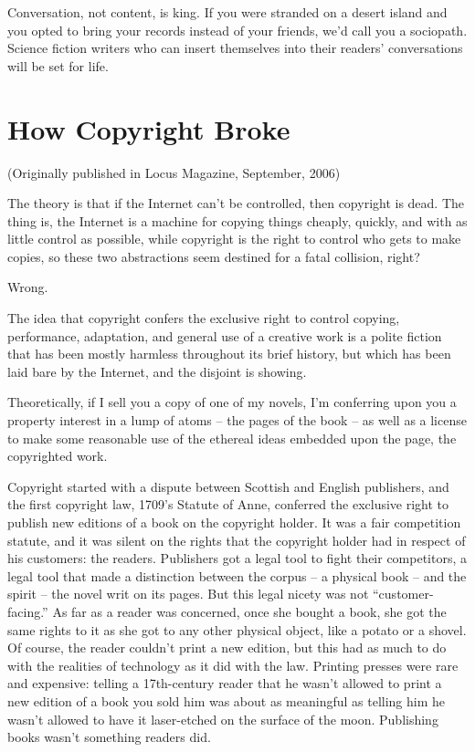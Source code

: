 Conversation, not content, is king. If you were stranded on a
desert island and you opted to bring your records instead of your
friends, we'd call you a sociopath. Science fiction writers who can
insert themselves into their readers' conversations will be set for
life.

\section{How Copyright Broke}

(Originally published in Locus Magazine, September, 2006)

The theory is that if the Internet can't be controlled, then
copyright is dead. The thing is, the Internet is a machine for
copying things cheaply, quickly, and with as little control as
possible, while copyright is the right to control who gets to make
copies, so these two abstractions seem destined for a fatal
collision, right?

Wrong.

The idea that copyright confers the exclusive right to control
copying, performance, adaptation, and general use of a creative
work is a polite fiction that has been mostly harmless throughout
its brief history, but which has been laid bare by the Internet,
and the disjoint is showing.

Theoretically, if I sell you a copy of one of my novels, I'm
conferring upon you a property interest in a lump of atoms -- the
pages of the book -- as well as a license to make some reasonable
use of the ethereal ideas embedded upon the page, the copyrighted
work.

Copyright started with a dispute between Scottish and English
publishers, and the first copyright law, 1709's Statute of Anne,
conferred the exclusive right to publish new editions of a book on
the copyright holder. It was a fair competition statute, and it was
silent on the rights that the copyright holder had in respect of
his customers: the readers. Publishers got a legal tool to fight
their competitors, a legal tool that made a distinction between the
corpus -- a physical book -- and the spirit -- the novel writ\sic{} on
its pages. But this legal nicety was not ``customer-facing.'' As far
as a reader was concerned, once she bought a book, she got the same
rights to it as she got to any other physical object, like a potato
or a shovel. Of course, the reader couldn't print a new edition,
but this had as much to do with the realities of technology as it
did with the law. Printing presses were rare and expensive: telling
a 17th-century reader that he wasn't allowed to print a new edition
of a book you sold him was about as meaningful as telling him he
wasn't allowed to have it laser-etched on the surface of the moon.
Publishing books wasn't something readers did.

